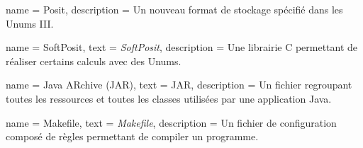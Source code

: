 {
    name = {Posit},
    description = {Un nouveau format de stockage spécifié dans les Unums III.}
}

{
    name = {SoftPosit},
    text = {\textit{SoftPosit}},
    description = {Une librairie C permettant de réaliser certains calculs avec des Unums.}
}

{
    name = {Java ARchive (JAR)},
    text = {JAR},
    description = {Un fichier regroupant toutes les ressources et toutes les classes utilisées par une application Java.}
}

{
    name = {Makefile},
    text = {\textit{Makefile}},
    description = {Un fichier de configuration composé de règles permettant de compiler un programme.}
}